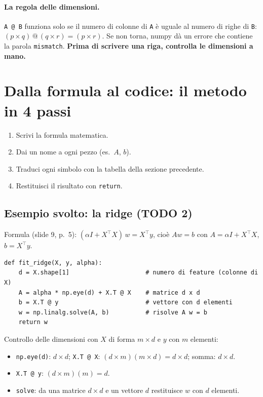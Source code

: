 \documentclass[11pt,a4paper]{article}
\begin{document}
\paragraph{La regola delle dimensioni.}
\texttt{A @ B} funziona solo se il numero di colonne di \texttt{A} è uguale al numero di righe di \texttt{B}:
$(p\times q)\,@\,(q\times r) = (p\times r)$. Se non torna, numpy dà un errore che contiene la parola \texttt{mismatch}.
\textbf{Prima di scrivere una riga, controlla le dimensioni a mano.}

\section{Dalla formula al codice: il metodo in 4 passi}
\begin{enumerate}
  \item Scrivi la formula matematica.
  \item Dai un nome a ogni pezzo (es.\ $A$, $b$).
  \item Traduci ogni simbolo con la tabella della sezione precedente.
  \item Restituisci il risultato con \texttt{return}.
\end{enumerate}

\subsection{Esempio svolto: la ridge (TODO 2)}
Formula (slide 9, p.~5): $(\alpha I + X^\top X)\,w = X^\top y$, cioè $A w = b$ con $A = \alpha I + X^\top X$, $b = X^\top y$.
\begin{lstlisting}
def fit_ridge(X, y, alpha):
    d = X.shape[1]                     # numero di feature (colonne di X)
    A = alpha * np.eye(d) + X.T @ X    # matrice d x d
    b = X.T @ y                        # vettore con d elementi
    w = np.linalg.solve(A, b)          # risolve A w = b
    return w
\end{lstlisting}
Controllo delle dimensioni con $X$ di forma $m\times d$ e $y$ con $m$ elementi:
\begin{itemize}
  \item \texttt{np.eye(d)}: $d\times d$; \quad \texttt{X.T @ X}: $(d\times m)(m\times d) = d\times d$; \quad somma: $d \times d$. \checkmark
  \item \texttt{X.T @ y}: $(d\times m)(m) = d$. \checkmark
  \item \texttt{solve}: da una matrice $d\times d$ e un vettore $d$ restituisce $w$ con $d$ elementi. \checkmark
\end{itemize}
\end{document}
